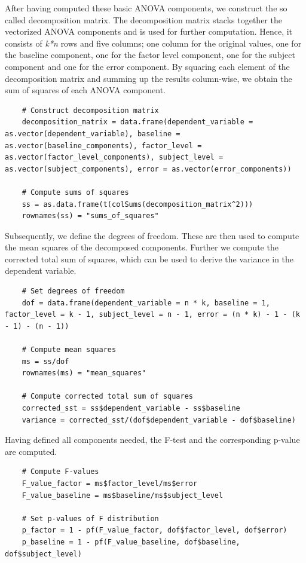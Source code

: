 \documentclass[11pt]{article}
\begin{document}
	After having computed these basic ANOVA components, we construct the so called decomposition matrix. The decomposition matrix stacks together the vectorized ANOVA components and is used for further computation. Hence, it consists of \textit{k*n} rows and five columns; one column for the original values, one for the baseline component, one for the factor level component, one for the subject component and one for the error component. By squaring each element of the decomposition matrix and summing up the results column-wise, we obtain the sum of squares of each ANOVA component.\\
	
	\begin{lstlisting}      
	# Construct decomposition matrix     
	decomposition_matrix = data.frame(dependent_variable = as.vector(dependent_variable), baseline = as.vector(baseline_components), factor_level = as.vector(factor_level_components), subject_level = as.vector(subject_components), error = as.vector(error_components))
	
	# Compute sums of squares
	ss = as.data.frame(t(colSums(decomposition_matrix^2)))
	rownames(ss) = "sums_of_squares"
	\end{lstlisting}      
	
	Subsequently, we define the degrees of freedom. These are then used to compute the mean squares of the decomposed components. Further we compute the corrected total sum of squares, which can be used to derive the variance in the dependent variable.\\
	
	\begin{lstlisting}
	# Set degrees of freedom
	dof = data.frame(dependent_variable = n * k, baseline = 1, factor_level = k - 1, subject_level = n - 1, error = (n * k) - 1 - (k - 1) - (n - 1))
	
	# Compute mean squares
	ms = ss/dof
	rownames(ms) = "mean_squares"
	
	# Compute corrected total sum of squares
	corrected_sst = ss$dependent_variable - ss$baseline
	variance = corrected_sst/(dof$dependent_variable - dof$baseline)
	\end{lstlisting}   
	
	Having defined all components needed, the F-test and the corresponding p-value are computed.\\
	
	\begin{lstlisting}   
	# Compute F-values 
	F_value_factor = ms$factor_level/ms$error
	F_value_baseline = ms$baseline/ms$subject_level
	
	# Set p-values of F distribution 
	p_factor = 1 - pf(F_value_factor, dof$factor_level, dof$error)
	p_baseline = 1 - pf(F_value_baseline, dof$baseline, dof$subject_level)
	\end{lstlisting}   
	
\end{document}
